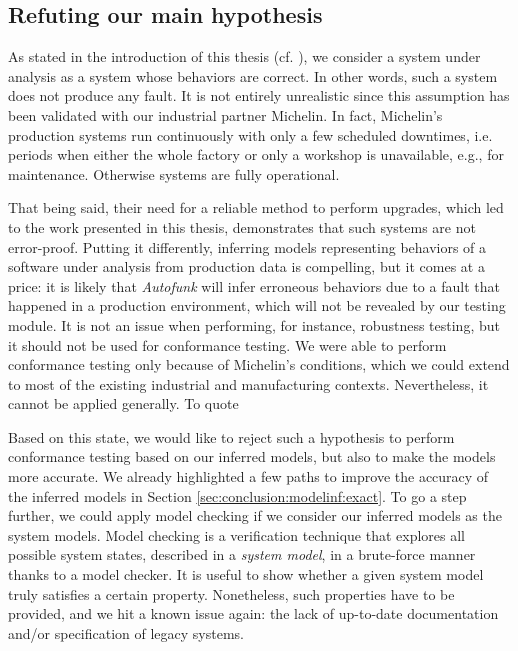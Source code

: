 

\subsection{Refuting our main hypothesis}
\label{sec:conclusion:testing:valid}

As stated in the introduction of this thesis (cf.
), we consider a system
under analysis as a system whose behaviors are correct. In other
words, such a system does not produce any fault. It is not
entirely unrealistic since this assumption has been validated
with our industrial partner Michelin. In fact, Michelin's
production systems run continuously with only a few scheduled
downtimes, i.e. periods when either the whole factory or only a
workshop is unavailable, e.g., for maintenance. Otherwise systems
are fully operational.

That being said, their need for a reliable method to perform
upgrades, which led to the work presented in this thesis,
demonstrates that such systems are not error-proof. Putting it
differently, inferring models representing behaviors of a
software under analysis from production data is compelling, but
it comes at a price: it is likely that \textit{Autofunk} will
infer erroneous behaviors due to a fault that happened in a
production environment, which will not be revealed by our testing
module. It is not an issue when performing, for instance,
robustness testing, but it should not be used for conformance
testing. We were able to perform conformance testing only because
of Michelin's conditions, which we could extend to most of the
existing industrial and manufacturing contexts. Nevertheless, it
cannot be applied generally. To quote

Based on this state, we would like to reject such a hypothesis to
perform conformance testing based on our inferred models, but
also to make the models more accurate. We already highlighted a
few paths to improve the accuracy of the inferred models in
Section \ref{sec:conclusion:modelinf:exact}. To go a step
further, we could apply model checking \cite{baier2008principles}
if we consider our inferred models as the system models. Model
checking is a verification technique that explores all possible
system states, described in a \textit{system model}, in a
brute-force manner thanks to a model checker. It is useful to
show whether a given system model truly satisfies a certain
property.  Nonetheless, such properties have to be provided, and
we hit a known issue again: the lack of up-to-date documentation
and/or specification of legacy systems.
